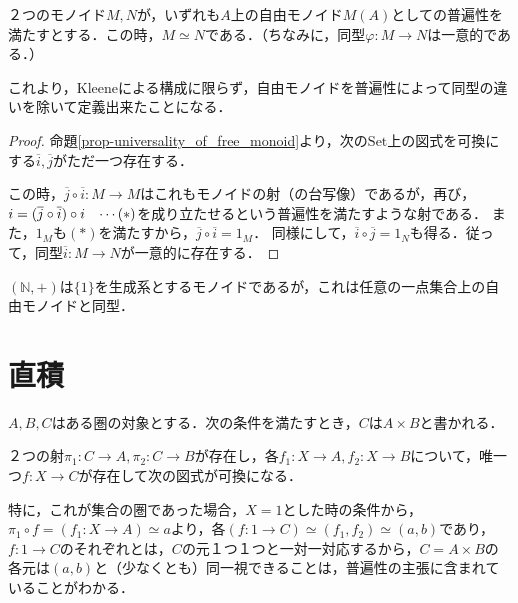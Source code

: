 \documentclass[uplatex, 12pt, dvipdfmx]{jsreport}
\begin{document}
\begin{proposition}
    ２つのモノイド$M,N$が，いずれも$A$上の自由モノイド$M(A)$としての普遍性を満たすとする．この時，$M\simeq N$である．（ちなみに，同型$\varphi:M\to N$は一意的である．）
\end{proposition}
これより，Kleeneによる構成に限らず，自由モノイドを普遍性によって同型の違いを除いて定義出来たことになる．
\begin{proof}
    命題\ref{prop-universality_of_free_monoid}より，次の$\mathrm{Set}$上の図式を可換にする$\overline{i},\overline{j}$がただ一つ存在する．
    \begin{center}\end{center}
    この時，$\overline{j}\circ\overline{i}:M\to M$はこれもモノイドの射（の台写像）であるが，再び，$i=(\overline{j}\circ\overline{i})\circ i\hspace{3mm}\cdots (*)$を成り立たせるという普遍性を満たすような射である．
    また，$1_M$も$(*)$を満たすから，$\overline{j}\circ\overline{i}=1_M$．
    同様にして，$\overline{i}\circ\overline{j}=1_N$も得る．従って，同型$\overline{i}:M\to N$が一意的に存在する．
\end{proof}

\begin{example}
    $(\mathbb{N},+)$は$\{ 1\}$を生成系とするモノイドであるが，これは任意の一点集合上の自由モノイドと同型．
\end{example}

\section{直積}

\begin{shadebox}\begin{definition}[積の普遍性]
    $A,B,C$はある圏の対象とする．次の条件を満たすとき，$C$は$A\times B$と書かれる．

    ２つの射$\pi_1:C\to A,\pi_2:C\to B$が存在し，各$f_1:X\to A, f_2:X\to B$について，唯一つ$f:X\to C$が存在して次の図式が可換になる．

    \begin{center}\end{center}
\end{definition}\end{shadebox}
特に，これが集合の圏であった場合，$X=1$とした時の条件から，$\pi_1\circ f = (f_1:X\to A) \simeq a$より，各$(f:1\to C) \simeq (f_1,f_2) \simeq (a,b)$であり，$f:1\to C$のそれぞれとは，$C$の元１つ１つと一対一対応するから，$C=A\times B$の各元は$(a,b)$と（少なくとも）同一視できることは，普遍性の主張に含まれていることがわかる．
\end{document}

